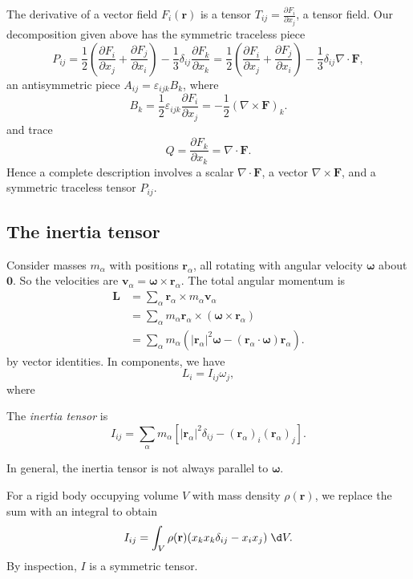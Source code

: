 \documentclass[a4paper]{article}
\begin{document}
\begin{eg}
  The derivative of a vector field $F_i (\mathbf{r})$ is a tensor $T_{ij} = \frac{\partial F_i}{\partial x_j}$, a tensor field. Our decomposition given above has the symmetric traceless piece
  \[
    P_{ij} = \frac{1}{2}\left(\frac{\partial F_i}{\partial x_j} + \frac{\partial F_j}{\partial x_i}\right) - \frac{1}{3}\delta_{ij}\frac{\partial F_k}{\partial x_k} = \frac{1}{2}\left(\frac{\partial F_i}{\partial x_j} + \frac{\partial F_j}{\partial x_i}\right) - \frac{1}{3}\delta_{ij}\nabla\cdot \mathbf{F},
  \]
  an antisymmetric piece $A_{ij} = \varepsilon_{ijk}B_k$, where 
  \[
    B_k = \frac{1}{2}\varepsilon_{ijk}\frac{\partial F_i}{\partial x_j} = -\frac{1}{2}(\nabla\times \mathbf{F})_k.
  \]
  and trace
  \[
    Q = \frac{\partial F_k}{\partial x_k} = \nabla \cdot \mathbf{F}.
  \]
  Hence a complete description involves a scalar $\nabla\cdot \mathbf{F}$, a vector $\nabla\times \mathbf{F}$, and a symmetric traceless tensor $P_{ij}$.
\end{eg}

\subsection{The inertia tensor}
Consider masses $m_\alpha$ with positions $\mathbf{r}_\alpha$, all rotating with angular velocity $\boldsymbol\omega$ about $\mathbf{0}$. So the velocities are $\mathbf{v}_\alpha = \boldsymbol\omega\times \mathbf{r}_\alpha$. The total angular momentum is 
\begin{align*}
  \mathbf{L} &= \sum_{\alpha} \mathbf{r}_\alpha \times m_\alpha \mathbf{v}_\alpha \\
  &= \sum_\alpha m_\alpha \mathbf{r}_\alpha \times (\boldsymbol\omega\times \mathbf{r}_\alpha)\\
  &= \sum_\alpha m_\alpha( |\mathbf{r}_\alpha|^2\boldsymbol\omega - (\mathbf{r}_\alpha \cdot \boldsymbol\omega)\mathbf{r}_\alpha).
\end{align*}
by vector identities. In components, we have 
\[
  L_i = I_{ij}\omega_j,
\]
where
\begin{defi}
  The \emph{inertia tensor} is
  \[
    I_{ij} = \sum_\alpha m_\alpha [|\mathbf{r}_\alpha|^2 \delta_{ij} - (\mathbf{r}_\alpha)_i (\mathbf{r}_\alpha)_j].
  \]
\end{defi}
\note In general, the inertia tensor is not always parallel to $\boldsymbol\omega$.

For a rigid body occupying volume $V$ with mass density $\rho(\mathbf{r})$, we replace the sum with an integral to obtain
\[
  I_{ij} = \int_V \rho (\mathbf{r})(x_kx_k \delta_{ij} - x_i x_j)\;\d V.
\]
By inspection, $I$ is a symmetric tensor.
\end{document}
